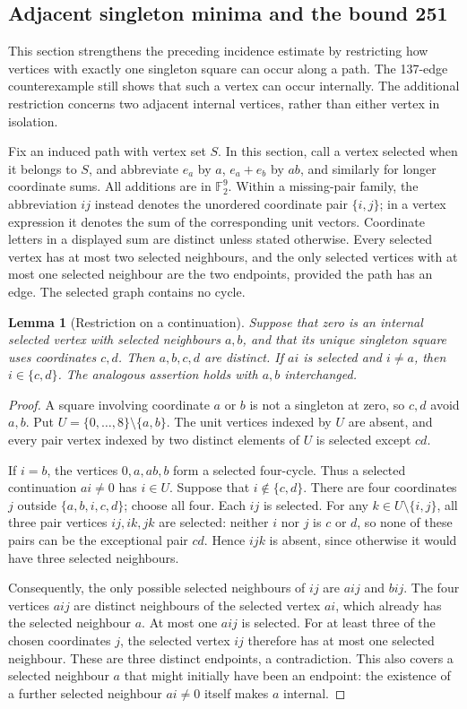 \documentclass[11pt,a4paper]{article}
\newtheorem{lemma}[theorem]{Lemma}
\theoremstyle{definition}
\theoremstyle{remark}
\begin{document}
\subsection{Adjacent singleton minima and the bound 251}
This section strengthens the preceding incidence estimate by restricting how vertices with exactly one singleton square can occur along a path. The 137-edge counterexample still shows that such a vertex can occur internally. The additional restriction concerns two adjacent internal vertices, rather than either vertex in isolation.

Fix an induced path with vertex set $S$. In this section, call a vertex selected when it belongs to $S$, and abbreviate $e_a$ by $a$, $e_a+e_b$ by $ab$, and similarly for longer coordinate sums. All additions are in $\mathbb F_2^9$. Within a missing-pair family, the abbreviation $ij$ instead denotes the unordered coordinate pair $\{i,j\}$; in a vertex expression it denotes the sum of the corresponding unit vectors. Coordinate letters in a displayed sum are distinct unless stated otherwise. Every selected vertex has at most two selected neighbours, and the only selected vertices with at most one selected neighbour are the two endpoints, provided the path has an edge. The selected graph contains no cycle.

\begin{lemma}[Restriction on a continuation]\label{lem:singleton-arm}
Suppose that zero is an internal selected vertex with selected neighbours $a,b$, and that its unique singleton square uses coordinates $c,d$. Then $a,b,c,d$ are distinct. If $ai$ is selected and $i\ne a$, then $i\in\{c,d\}$. The analogous assertion holds with $a,b$ interchanged.
\end{lemma}
\begin{proof}
A square involving coordinate $a$ or $b$ is not a singleton at zero, so $c,d$ avoid $a,b$. Put $U=\{0,\ldots,8\}\setminus\{a,b\}$. The unit vertices indexed by $U$ are absent, and every pair vertex indexed by two distinct elements of $U$ is selected except $cd$.

If $i=b$, the vertices $0,a,ab,b$ form a selected four-cycle. Thus a selected continuation $ai\ne0$ has $i\in U$. Suppose that $i\notin\{c,d\}$. There are four coordinates $j$ outside $\{a,b,i,c,d\}$; choose all four. Each $ij$ is selected. For any $k\in U\setminus\{i,j\}$, all three pair vertices $ij,ik,jk$ are selected: neither $i$ nor $j$ is $c$ or $d$, so none of these pairs can be the exceptional pair $cd$. Hence $ijk$ is absent, since otherwise it would have three selected neighbours.

Consequently, the only possible selected neighbours of $ij$ are $aij$ and $bij$. The four vertices $aij$ are distinct neighbours of the selected vertex $ai$, which already has the selected neighbour $a$. At most one $aij$ is selected. For at least three of the chosen coordinates $j$, the selected vertex $ij$ therefore has at most one selected neighbour. These are three distinct endpoints, a contradiction. This also covers a selected neighbour $a$ that might initially have been an endpoint: the existence of a further selected neighbour $ai\ne0$ itself makes $a$ internal.
\end{proof}
\end{document}
